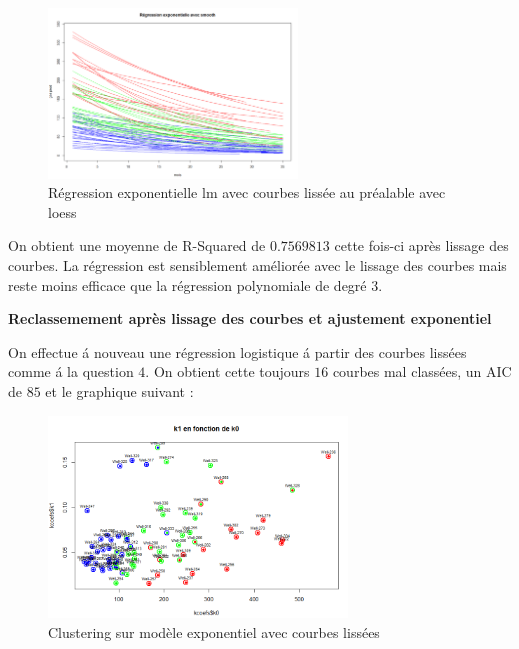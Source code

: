 \documentclass[12pt]{article}
\begin{document}
\begin{figure}[H]
 \centering %
	\includegraphics[width=250px]{reg_exp_smooth_loess}
  \caption{\label{fig:reg_exp_smooth_loess} R\'egression exponentielle lm avec courbes liss\'ee au pr\'ealable avec loess}
\end{figure}

On obtient une moyenne de R-Squared de $0.7569813$ cette fois-ci apr\`es lissage des courbes. La r\'egression est sensiblement am\'elior\'ee avec le lissage des courbes mais reste moins efficace que la r\'egression polynomiale de degr\'e 3.

\newpage

\textbf{Reclassemement apr\`es lissage des courbes et ajustement exponentiel}

On effectue \'a nouveau une r\'egression logistique \'a partir des courbes liss\'ees comme \'a la question $4$.
On obtient cette toujours $16$ courbes mal class\'ees, un AIC de $85$ et le graphique suivant : 

\begin{figure}[H]
 \centering %
	\includegraphics[width=300px]{smooth_clustering_exp}
  \caption{\label{fig:reg_exp_clust} Clustering sur mod\`ele exponentiel avec courbes liss\'ees}
\end{figure}
\end{document}

